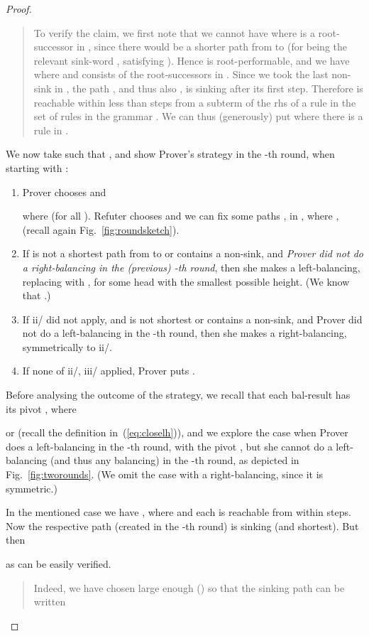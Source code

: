\documentclass{llncs}
\begin{document}
\begin{proof}
\begin{quote}
	{\small	
To verify the claim, we first note 
that we cannot have 
where  is a root-successor in , since there would be a shorter
path  from  to  (for 
being
the relevant sink-word , satisfying ).
Hence   is root-performable, and we have
 where
 and
 consists of the root-successors in .
Since we took the last non-sink in ,
the path , and thus also 
,
is sinking after its first
step. Therefore  is reachable within less than  steps from a
subterm of the rhs  of a rule  in the set 
 of rules in the grammar . We can thus (generously) put
 where 
 there is a rule
 in .
}
\end{quote}
We now take  such that ,
and show Prover's strategy in the -th round, when starting 
with 
:
		\begin{enumerate}[i/]
	\item
		Prover chooses  
		and
		
		where		
		 (for all ).
		Refuter chooses  and 
		we can fix some paths 
, 
in ,
where ,  (recall again
Fig.~\ref{fig:roundsketch}).
	\item 
If  is not a shortest path from  to  or contains a non-sink,
and \emph{Prover did not do a right-balancing in the (previous) 
-th round}, then she makes 
a left-balancing, 
replacing  with 
, for some head  with the
		smallest possible height. 
		(We know that .)
	\item
If ii/ did not apply, and 
 is not shortest or contains a non-sink,
and Prover did not do a left-balancing in the 
		-th round, then she 
		makes 
a right-balancing, symmetrically to ii/. 
	\item
If none of ii/, iii/ applied, 
Prover 
puts .
\end{enumerate}
Before analysing the outcome of the strategy, 
we recall that each
bal-result  has its pivot , where
 
or 
(recall the definition in~(\ref{eq:closelh})),
and we explore the case when Prover  does a left-balancing 
in the -th round, with the pivot
,
but she cannot do a left-balancing (and thus any balancing) in the 
-th round, as depicted in Fig.~\ref{fig:tworounds}. (We omit the case with a right-balancing, since it
is symmetric.)

In the mentioned case we have
, 
where  and each  is reachable
from  within  steps.
Now 
the respective path  (created in the 
-th round) is sinking (and
shortest). But then   
 
as can be easily verified.
\begin{quote}
	{\small	
Indeed, 
we have chosen  large enough 
() so that the sinking path 
 can be written

}
\end{quote}
\end{proof}
\end{document}
